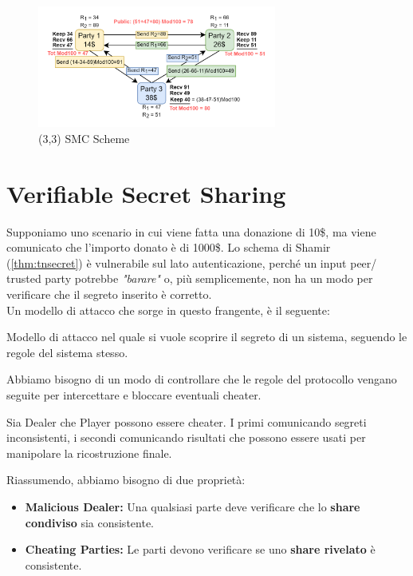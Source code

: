 \begin{figure}[h]
\vspace{-10pt}
    \centering
    \includegraphics[width=0.7\textwidth]{image/secret_sharing/inputprivacy.png}
    \caption{(3,3) SMC Scheme}
    \label{fig:inputprivacy}
\end{figure}
\section{Verifiable Secret Sharing}
Supponiamo uno scenario in cui viene fatta una donazione di 10\$, ma viene comunicato che l'importo donato è di 1000\$. Lo schema di Shamir (\cref{thm:tnsecret}) è vulnerabile sul lato autenticazione, perché un input peer/ trusted party potrebbe \textit{"barare"} o, più semplicemente, non ha un modo per verificare che il segreto inserito è corretto.\\
Un modello di attacco che sorge in questo frangente, è il seguente:
\begin{definition}\label{def:honestcurious}
Modello di attacco nel quale si vuole scoprire il segreto di un sistema, seguendo le regole del sistema stesso.
\end{definition}
Abbiamo bisogno di un modo di controllare che le regole del protocollo vengano seguite per intercettare e bloccare eventuali cheater.\\
\begin{remark}
Sia Dealer che Player possono essere cheater. I primi comunicando segreti inconsistenti, i secondi comunicando risultati che possono essere usati per manipolare la ricostruzione finale.
\end{remark}
Riassumendo, abbiamo bisogno di due proprietà:
\begin{itemize}
    \item \textbf{Malicious Dealer:} Una qualsiasi parte deve verificare che lo \textbf{share condiviso} sia consistente.
    \item \textbf{Cheating Parties:} Le parti devono verificare se uno \textbf{share rivelato} è consistente.
\end{itemize}

